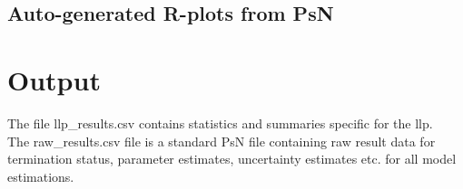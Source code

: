 \subsection{Auto-generated R-plots from PsN}
\newcommand{\rplotsconditions}{The default llp template 
requires the R libraries ggplot2, reshape and plyr.
If the packages are not installed then no pdf will be generated,
see the .Rout file in the main run directory for error messages.}



\section{Output}

The file llp\_results.csv contains statistics and summaries specific for the llp. \\
The raw\_results.csv file is a standard PsN file containing raw result data for termination status, parameter estimates, uncertainty estimates etc. for all model estimations. 


